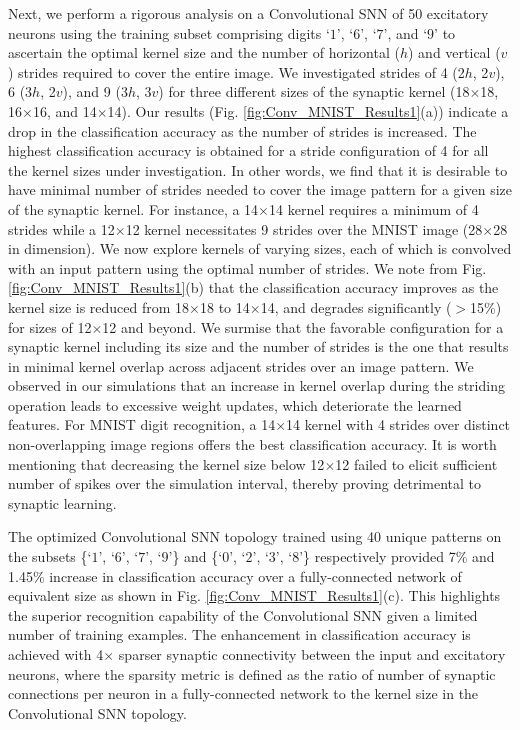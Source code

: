 \documentclass[journal, onecolumn]{IEEEtran}
\begin{document}
Next, we perform a rigorous analysis on a Convolutional SNN of 50 excitatory neurons using the training subset comprising digits `$1$', `$6$', `$7$', and `$9$' to ascertain the optimal kernel size and the number of horizontal ($h$) and vertical ($v$) strides required to cover the entire image. We investigated strides of 4 (2$h$, 2$v$), 6 (3$h$, 2$v$), and 9 (3$h$, 3$v$) for three different sizes of the synaptic kernel (18$\times$18, 16$\times$16, and 14$\times$14). Our results (Fig. \ref{fig:Conv_MNIST_Results1}(a)) indicate a drop in the classification accuracy as the number of strides is increased. The highest classification accuracy is obtained for a stride configuration of 4 for all the kernel sizes under investigation. In other words, we find that it is desirable to have minimal number of strides needed to cover the image pattern for a given size of the synaptic kernel. For instance, a 14$\times$14 kernel requires a minimum of 4 strides while a 12$\times$12 kernel necessitates 9 strides over the MNIST image (28$\times$28 in dimension). We now explore kernels of varying sizes, each of which is convolved with an input pattern using the optimal number of strides. We note from Fig. \ref{fig:Conv_MNIST_Results1}(b) that the classification accuracy improves as the kernel size is reduced from 18$\times$18 to 14$\times$14, and degrades significantly ($>$15\%) for sizes of 12$\times$12 and beyond. We surmise that the favorable configuration for a synaptic kernel including its size and the number of strides is the one that results in minimal kernel overlap across adjacent strides over an image pattern. We observed in our simulations that an increase in kernel overlap during the striding operation leads to excessive weight updates, which deteriorate the learned features. For MNIST digit recognition, a 14$\times$14 kernel with 4 strides over distinct non-overlapping image regions offers the best classification accuracy. It is worth mentioning that decreasing the kernel size below 12$\times$12 failed to elicit sufficient number of spikes over the simulation interval, thereby proving detrimental to synaptic learning.

The optimized Convolutional SNN topology trained using 40 unique patterns on the subsets \{`$1$', `$6$', `$7$', `$9$'\} and \{`$0$', `$2$', `$3$', `$8$'\} respectively provided 7\% and 1.45\% increase in classification accuracy over a fully-connected network of equivalent size as shown in Fig. \ref{fig:Conv_MNIST_Results1}(c). This highlights the superior recognition capability of the Convolutional SNN given a limited number of training examples. The enhancement in classification accuracy is achieved with 4$\times$ sparser synaptic connectivity between the input and excitatory neurons, where the sparsity metric is defined as the ratio of number of synaptic connections per neuron in a fully-connected network to the kernel size in the Convolutional SNN topology.
\end{document}
